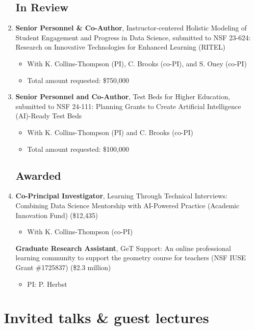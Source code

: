 \documentclass[a4paper,11pt]{article}
\newcommand{\years}[1]{%
  {\reversemarginpar\strut\marginnote{{\small#1}}}%
}
\newcommand{\yearsitem}[1]{%
  \item {\reversemarginpar\strut\marginnote{{\small#1}}}%
}
\begin{document}
\begin{enumerate}
\subsection*{In Review}

\yearsitem{2025}\textbf{Senior Personnel \& Co-Author}, Instructor-centered Holistic Modeling of Student Engagement and Progress in Data Science, submitted to NSF 23-624: Research on Innovative Technologies for Enhanced Learning (RITEL)
\begin{itemize}
    \item With K. Collins-Thompson (PI), C. Brooks (co-PI), and S. Oney (co-PI)
    \item Total amount requested: \$750,000
\end{itemize}

\item \textbf{Senior Personnel and Co-Author}, Test Beds for Higher Education, submitted to NSF 24-111: Planning Grants to Create Artificial Intelligence (AI)-Ready Test Beds
\begin{itemize}
    \item With K. Collins-Thompson (PI) and C. Brooks (co-PI)
    \item Total amount requested: \$100,000
\end{itemize}

\subsection*{Awarded}

\yearsitem{2025}\textbf{Co-Principal Investigator}, Learning Through Technical Interviews: Combining Data Science Mentorship with AI-Powered Practice (Academic Innovation Fund) (\$12,435)
\begin{itemize}
    \item With K. Collins-Thompson (co-PI)
\end{itemize}

\years{2017--2023}\textbf{Graduate Research Assistant}, GeT Support: An online professional learning community to support the geometry course for teachers (NSF IUSE Grant \#1725837) (\$2.3 million)
\begin{itemize}
    \item PI: P. Herbst
\end{itemize}
\end{enumerate}


\section*{Invited talks \& guest lectures}
\end{document}
